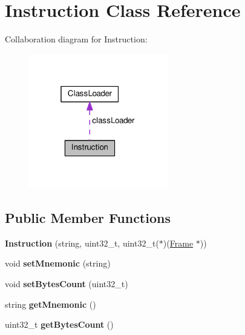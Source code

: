 \hypertarget{classInstruction}{}\section{Instruction Class Reference}
\label{classInstruction}


Collaboration diagram for Instruction\+:\nopagebreak
\begin{figure}[H]
\begin{center}
\leavevmode
\includegraphics[width=172pt]{classInstruction__coll__graph}
\end{center}
\end{figure}
\subsection*{Public Member Functions}
\begin{DoxyCompactItemize}
\item 
{\bfseries Instruction} (string, uint32\+\_\+t, uint32\+\_\+t($\ast$)(\hyperlink{classFrame}{Frame} $\ast$))\hypertarget{classInstruction_a796b0697656d6d1230d94f942680245b}{}\label{classInstruction_a796b0697656d6d1230d94f942680245b}

\item 
void {\bfseries set\+Mnemonic} (string)\hypertarget{classInstruction_a507efd4e2f184c09f4349b682479bfb5}{}\label{classInstruction_a507efd4e2f184c09f4349b682479bfb5}

\item 
void {\bfseries set\+Bytes\+Count} (uint32\+\_\+t)\hypertarget{classInstruction_a963419f34dc60eba3f5e5d8aa86da6f2}{}\label{classInstruction_a963419f34dc60eba3f5e5d8aa86da6f2}

\item 
string {\bfseries get\+Mnemonic} ()\hypertarget{classInstruction_a467cd8f7f8f8d22c9d3d26c9dbbb6b97}{}\label{classInstruction_a467cd8f7f8f8d22c9d3d26c9dbbb6b97}

\item 
uint32\+\_\+t {\bfseries get\+Bytes\+Count} ()\hypertarget{classInstruction_a0cc76fd49fa6bc6f7ec395484fa18cb3}{}\label{classInstruction_a0cc76fd49fa6bc6f7ec395484fa18cb3}

\end{DoxyCompactItemize}
